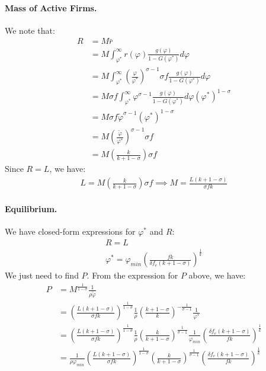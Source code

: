 \begin{solution}
\paragraph{Mass of Active Firms.} We note that:
\begin{align*}
R &= M \bar{r} \\
&= M \int_{\varphi^*}^{\infty} r(\varphi) \frac{g(\varphi)}{1 - G(\varphi^*)} d\varphi \\
&= M \int_{\varphi^*}^{\infty} \left(\frac{\varphi}{\varphi^*}\right)^{\sigma - 1} \sigma f \frac{g(\varphi)}{1 - G(\varphi^*)} d\varphi \\
&= M \sigma f \int_{\varphi^*}^{\infty} \varphi^{\sigma - 1} \frac{g(\varphi)}{1 - G(\varphi^*)} d\varphi \left(\varphi^*\right)^{1 - \sigma} \\
&= M \sigma f \tilde{\varphi}^{\sigma - 1} \left(\varphi^*\right)^{1 - \sigma} \\
&= M \left(\frac{\tilde{\varphi}}{\varphi^*}\right)^{\sigma - 1} \sigma f \\
&= M \left( \frac{k}{k + 1 - \sigma} \right) \sigma f
\end{align*}
Since $R = L$, we have:
\begin{align*}
L = M \left( \frac{k}{k + 1 - \sigma} \right) \sigma f \implies M = \frac{L (k + 1 - \sigma)}{\sigma f k}
\end{align*}

\paragraph{Equilibrium.} We have closed-form expressions for $\varphi^*$ and $R$:
\begin{align*}
    R = L\\
    \varphi^* = \varphi_{min} \left(\frac{fk}{\delta f_e (k + 1 - \sigma)}\right)^{\frac{1}{k}}
\end{align*}
We just need to find $P$. From the expression for $P$ above, we have:
\begin{align*}
    P &= M^{\frac{1}{1 - \sigma}} \frac{1}{\rho \tilde{\varphi}}\\
    &= \left( \frac{L (k + 1 - \sigma)}{\sigma f k} \right)^{\frac{1}{1 - \sigma}} \frac{1}{\rho} \left( \frac{k + 1 - \sigma}{k} \right)^{-\frac{1}{\sigma - 1}} \frac{1}{\varphi^*} \\
    &= \left( \frac{L (k + 1 - \sigma)}{\sigma f k} \right)^{\frac{1}{1 - \sigma}} \frac{1}{\rho} \left( \frac{k}{k + 1 - \sigma} \right)^{\frac{1}{\sigma - 1}} \frac{1}{\varphi_{min}} \left(\frac{\delta f_e (k + 1 - \sigma)}{fk}\right)^{\frac{1}{k}} \\
    &= \frac{1}{\rho \varphi_{min}} \left( \frac{L (k + 1 - \sigma)}{\sigma f k} \right)^{\frac{1}{1 - \sigma}} \left( \frac{k}{k + 1 - \sigma} \right)^{\frac{1}{\sigma - 1}} \left(\frac{\delta f_e (k + 1 - \sigma)}{fk}\right)^{\frac{1}{k}} 
\end{align*}
\end{solution}